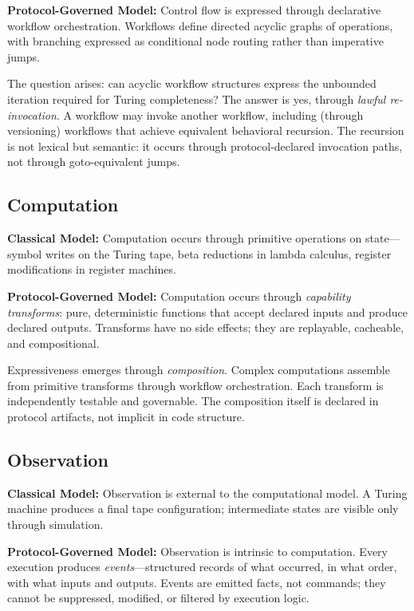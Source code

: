 \documentclass[11pt,a4paper]{article}
\begin{document}
\textbf{Protocol-Governed Model:} Control flow is expressed through declarative workflow orchestration. Workflows define directed acyclic graphs of operations, with branching expressed as conditional node routing rather than imperative jumps.

The question arises: can acyclic workflow structures express the unbounded iteration required for Turing completeness? The answer is yes, through \emph{lawful re-invocation}. A workflow may invoke another workflow, including (through versioning) workflows that achieve equivalent behavioral recursion. The recursion is not lexical but semantic: it occurs through protocol-declared invocation paths, not through goto-equivalent jumps.

\subsection{Computation}

\textbf{Classical Model:} Computation occurs through primitive operations on state---symbol writes on the Turing tape, beta reductions in lambda calculus, register modifications in register machines.

\textbf{Protocol-Governed Model:} Computation occurs through \emph{capability transforms}: pure, deterministic functions that accept declared inputs and produce declared outputs. Transforms have no side effects; they are replayable, cacheable, and compositional.

Expressiveness emerges through \emph{composition}. Complex computations assemble from primitive transforms through workflow orchestration. Each transform is independently testable and governable. The composition itself is declared in protocol artifacts, not implicit in code structure.

\subsection{Observation}

\textbf{Classical Model:} Observation is external to the computational model. A Turing machine produces a final tape configuration; intermediate states are visible only through simulation.

\textbf{Protocol-Governed Model:} Observation is intrinsic to computation. Every execution produces \emph{events}---structured records of what occurred, in what order, with what inputs and outputs. Events are emitted facts, not commands; they cannot be suppressed, modified, or filtered by execution logic.
\end{document}
